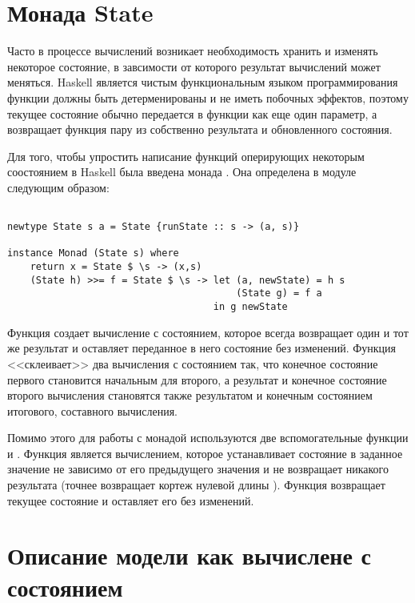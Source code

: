 \section{Монада State}

Часто в процессе вычислений возникает необходимость хранить и изменять некоторое состояние, в завсимости от которого результат вычислений может меняться. Haskell является чистым функциональным языком программирования функции должны быть детерменированы и не иметь побочных эффектов, поэтому текущее состояние обычно передается в функции как еще один параметр, а возвращает функция пару из собственно результата и обновленного состояния.

Для того, чтобы упростить написание функций оперирующих некоторым соостоянием в Haskell была введена монада . Она определена в модуле  следующим образом:

\begin{verbatim}

newtype State s a = State {runState :: s -> (a, s)}

instance Monad (State s) where
    return x = State $ \s -> (x,s)
    (State h) >>= f = State $ \s -> let (a, newState) = h s
                                        (State g) = f a
                                    in g newState

\end{verbatim}

Функция  создает вычисление с состоянием, которое всегда возвращает один и тот же результат и оставляет переданное в него состояние без изменений. Функция \Code{$>>=$} <<склеивает>> два вычисления с состоянием так, что конечное  состояние первого становится начальным для второго, а результат и конечное состояние второго вычисления становятся также результатом и конечным состоянием итогового, составного вычисления.

Помимо этого для работы с монадой  используются две вспомогательные функции  и . Функция  является вычислением, которое устанавливает состояние в заданное значение не зависимо от его предыдущего значения и не возвращает никакого результата (точнее возвращает кортеж нулевой длины \Code{()}). Функция  возвращает текущее состояние и оставляет его без изменений. 

\section{Описание модели как вычислене с состоянием}
